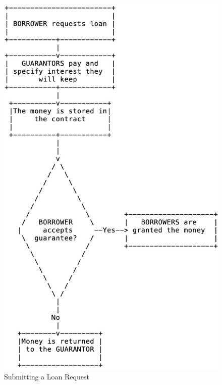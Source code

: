 \documentclass[a4paper, 12pt]{article}
\begin{document}
\begin{figure}[h!]
	\centering
	\includegraphics[width=\textwidth]{./Diagrams/problem1-flowchart}
	\caption{Submitting a Loan Request}
	\label{fig:flowchart1}
\end{figure}
\end{document}
